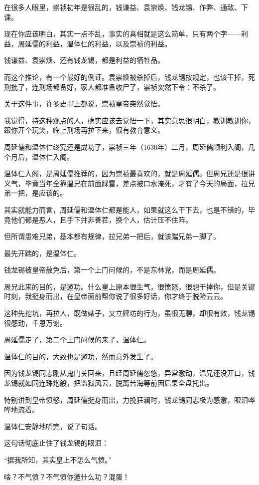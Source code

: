\begin{multicols}{\theparacolNo}
在很多人眼里，崇祯初年是很乱的，钱谦益、袁崇焕、钱龙锡、作弊、通敌、下课。

现在你应该明白，其实一点不乱，事实的真相就是这么简单，只有两个字——利益，周延儒的利益，温体仁的利益，以及崇祯的利益。

钱谦益、袁崇焕、还有钱龙锡，都是利益的牺牲品。

而这个推论，有一个最好的例证。袁崇焕被杀掉后，钱龙锡按规定，也该干掉，死刑批了，连刑场都备好，家人都准备收尸了，崇祯突然下令：不杀了。

关于这件事，许多史书上都说，崇祯皇帝突然觉悟。

我觉得，持这种观点的人，确实应该去觉悟一下，其实意思很明白，教训教训你，跟你开个玩笑，临上刑场再拉下来，很有教育意义。

周延儒和温体仁终究还是成功了，崇祯三年（1630年）二月，周延儒顺利入阁，几个月后，温体仁入阁。

温体仁入阁，是周延儒推荐的，因为崇祯最喜欢的，就是周延儒。但周兄还是很讲义气，毕竟当年全靠温兄在前面踩雷，差点被口水淹死，才有了今天的局面，拉兄弟一把，是应该的。

其实就能力而言，周延儒和温体仁都是能人，如果就这么干下去，也是不错的，毕竟他们都是恶人，且手下并非善茬，换个人，估计压不住阵。

但所谓患难兄弟，基本都有规律，拉兄弟一把后，就该踹兄弟一脚了。

最先开踹的，是温体仁。

钱龙锡被皇帝赦免后，第一个上门问候的，不是东林党，而是周延儒。

周兄此来的目的，是邀功。什么皇上原本很生气，很愤怒，很想干掉你，但是关键时刻，我挺身而出，在皇帝面前帮你说了很多好话，你才终于脱险云云。

这种先挖坑，再拉人，既做婊子，又立牌坊的行为，虽很无聊，却很有效，钱龙锡很感动，千恩万谢。

周延儒走了，第二个上门问候的来了，温体仁。

温体仁的目的，大致也是邀功，然而意外发生了。

因为钱龙锡同志刚从鬼门关回来，且经周延儒忽悠，异常激动，温兄还没开口，钱龙锡就如同连珠炮般，把监狱风云，脱离苦海等前因后果全盘托出。

特别讲到皇帝愤怒，周延儒挺身而出，力挽狂澜时，钱龙锡同志极为感激，眼泪哗哗地流着。

温体仁安静地听完，说了句话。

这句话彻底止住了钱龙锡的眼泪：

“据我所知，其实皇上不怎么气愤。”

啥？不气愤？不气愤你邀什么功？混蛋！


\end{multicols}
